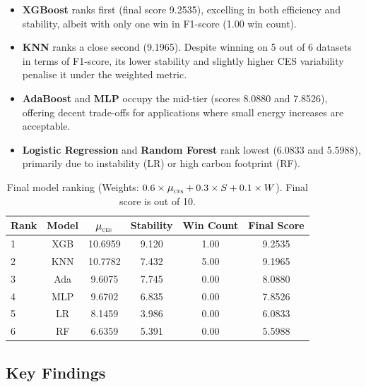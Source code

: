 \documentclass[conference]{IEEEtran}
\newcommand{\muCES}{\scalebox{1.1}{$\mu$}_{\scalebox{0.5}{CES}}}
\begin{document}
\begin{itemize}[nosep, leftmargin=*]
    \item \textbf{XGBoost} ranks first (final score 9.2535), excelling in both efficiency and stability, albeit with only one win in F1-score (1.00 win count).  
    \item \textbf{KNN} ranks a close second (9.1965). Despite winning on 5 out of 6 datasets in terms of F1-score, its lower stability and slightly higher CES variability penalise it under the weighted metric.  
    \item \textbf{AdaBoost} and \textbf{MLP} occupy the mid-tier (scores 8.0880 and 7.8526), offering decent trade-offs for applications where small energy increases are acceptable.  
    \item \textbf{Logistic Regression} and \textbf{Random Forest} rank lowest (6.0833 and 5.5988), primarily due to instability (LR) or high carbon footprint (RF).
\end{itemize}

\begin{table}[htbp]
\centering
\small
\setlength{\tabcolsep}{4pt}
\caption{Final model ranking (Weights: $0.6 \times \muCES + 0.3 \times S + 0.1 \times W$). Final score is out of 10.}
\label{tab:ranking}
\small
\setlength{\tabcolsep}{4pt}
\begin{tabular}{lccccc}
\toprule
\textbf{Rank} & 
\textbf{Model} & 
\textbf{$\muCES$} & 
\textbf{Stability} & 
\textbf{Win Count} & 
\textbf{Final Score} \\
\midrule
1 & XGB  & 10.6959 & 9.120 & 1.00 & 9.2535 \\
2 & KNN  & 10.7782 & 7.432 & 5.00 & 9.1965 \\
3 & Ada  & 9.6075  & 7.745 & 0.00 & 8.0880 \\
4 & MLP  & 9.6702  & 6.835 & 0.00 & 7.8526 \\
5 & LR   & 8.1459  & 3.986 & 0.00 & 6.0833 \\
6 & RF   & 6.6359  & 5.391 & 0.00 & 5.5988 \\
\bottomrule
\end{tabular}
\end{table}

\subsection{Key Findings}
\end{document}
